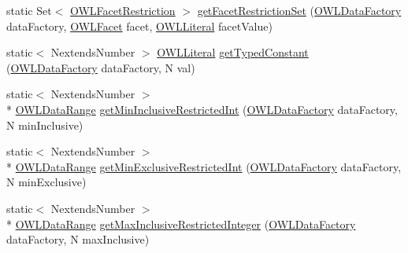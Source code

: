 \begin{DoxyCompactItemize}
\item 
static Set$<$ \hyperlink{interfaceorg_1_1semanticweb_1_1owlapi_1_1model_1_1_o_w_l_facet_restriction}{O\-W\-L\-Facet\-Restriction} $>$ \hyperlink{classorg_1_1semanticweb_1_1owlapi_1_1util_1_1_o_w_l_data_util_a6d6530d13ae331c23953134d8bb34502}{get\-Facet\-Restriction\-Set} (\hyperlink{interfaceorg_1_1semanticweb_1_1owlapi_1_1model_1_1_o_w_l_data_factory}{O\-W\-L\-Data\-Factory} data\-Factory, \hyperlink{enumorg_1_1semanticweb_1_1owlapi_1_1vocab_1_1_o_w_l_facet}{O\-W\-L\-Facet} facet, \hyperlink{interfaceorg_1_1semanticweb_1_1owlapi_1_1model_1_1_o_w_l_literal}{O\-W\-L\-Literal} facet\-Value)
\item 
static$<$ Nextends\-Number $>$ \hyperlink{interfaceorg_1_1semanticweb_1_1owlapi_1_1model_1_1_o_w_l_literal}{O\-W\-L\-Literal} \hyperlink{classorg_1_1semanticweb_1_1owlapi_1_1util_1_1_o_w_l_data_util_a73b3cd503d767a0b67aaa9a9879ff488}{get\-Typed\-Constant} (\hyperlink{interfaceorg_1_1semanticweb_1_1owlapi_1_1model_1_1_o_w_l_data_factory}{O\-W\-L\-Data\-Factory} data\-Factory, N val)
\item 
static$<$ Nextends\-Number $>$\\*
 \hyperlink{interfaceorg_1_1semanticweb_1_1owlapi_1_1model_1_1_o_w_l_data_range}{O\-W\-L\-Data\-Range} \hyperlink{classorg_1_1semanticweb_1_1owlapi_1_1util_1_1_o_w_l_data_util_aefb57a96e3868875f9c75615f9218d0e}{get\-Min\-Inclusive\-Restricted\-Int} (\hyperlink{interfaceorg_1_1semanticweb_1_1owlapi_1_1model_1_1_o_w_l_data_factory}{O\-W\-L\-Data\-Factory} data\-Factory, N min\-Inclusive)
\item 
static$<$ Nextends\-Number $>$\\*
 \hyperlink{interfaceorg_1_1semanticweb_1_1owlapi_1_1model_1_1_o_w_l_data_range}{O\-W\-L\-Data\-Range} \hyperlink{classorg_1_1semanticweb_1_1owlapi_1_1util_1_1_o_w_l_data_util_a63f69eda4487dd853186468302a37fd8}{get\-Min\-Exclusive\-Restricted\-Int} (\hyperlink{interfaceorg_1_1semanticweb_1_1owlapi_1_1model_1_1_o_w_l_data_factory}{O\-W\-L\-Data\-Factory} data\-Factory, N min\-Exclusive)
\item 
static$<$ Nextends\-Number $>$\\*
 \hyperlink{interfaceorg_1_1semanticweb_1_1owlapi_1_1model_1_1_o_w_l_data_range}{O\-W\-L\-Data\-Range} \hyperlink{classorg_1_1semanticweb_1_1owlapi_1_1util_1_1_o_w_l_data_util_a34bb707bfc97f873e3e44f7ce6c42590}{get\-Max\-Inclusive\-Restricted\-Integer} (\hyperlink{interfaceorg_1_1semanticweb_1_1owlapi_1_1model_1_1_o_w_l_data_factory}{O\-W\-L\-Data\-Factory} data\-Factory, N max\-Inclusive)

\end{DoxyCompactItemize}
